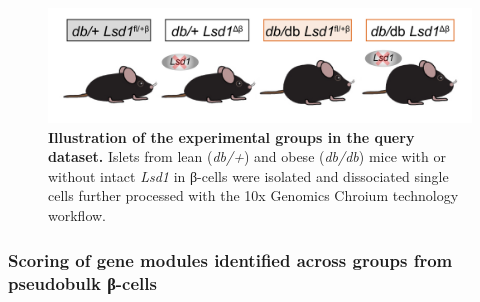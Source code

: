 
\begin{figure}[H]
    \centering
    \includegraphics[width=\linewidth]{Chapter5/Fig/F3-17-02.png}
    \caption[Study design of the query dataset]{\textbf{Illustration of the experimental groups in the query dataset.} Islets from lean (\textit{db/+}) and obese (\textit{db/db}) mice with or without intact \textit{Lsd1} in β-cells were isolated and dissociated single cells further processed with the 10x Genomics Chroium technology workflow.}
    \label{fig:chp3_valid_study_design}
\end{figure}


\subsubsection{\large Scoring of gene modules identified across groups from pseudobulk β-cells}

